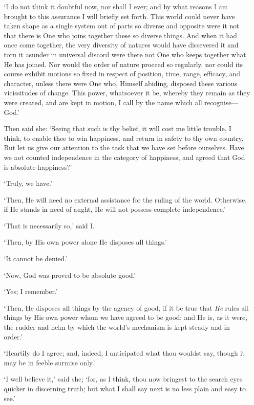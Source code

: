 \documentclass[11pt]{book}
\begin{document}
`I do not think it doubtful now, nor shall I ever; and by what reasons
I am brought to this assurance I will briefly set forth. This world
could never have taken shape as a single system out of parts so diverse
and opposite were it not that there is One who joins together these so
diverse things. And when it had once come together, the very diversity
of natures would have dissevered it and torn it asunder in universal
discord were there not One who keeps together what He has joined. Nor
would the order of nature proceed so regularly, nor could its course
exhibit motions so fixed in respect of position, time, range, efficacy,
and character, unless there were One who, Himself abiding, disposed
these various vicissitudes of change. This power, whatsoever it be,
whereby they remain as they were created, and are kept in motion, I call
by the name which all recognise---God.'

Then said she: `Seeing that such is thy belief, it will cost me little
trouble, I think, to enable thee to win happiness, and return in safety
to thy own country. But let us give our attention to the task that we
have set before ourselves. Have we not counted independence in the
category of happiness, and agreed that God is absolute happiness?'

`Truly, we have.'

`Then, He will need no external assistance for the ruling of the world.
Otherwise, if He stands in need of aught, He will not possess complete
independence.'

`That is necessarily so,' said I.

`Then, by His own power alone He disposes all things.'

`It cannot be denied.'

`Now, God was proved to be absolute good.'

`Yes; I remember.'

`Then, He disposes all things by the agency of good, if it be true that
\emph{He} rules all things by His own power whom we have agreed to be good;
and He is, as it were, the rudder and helm by which the world's
mechanism is kept steady and in order.'

`Heartily do I agree; and, indeed, I anticipated what thou wouldst say,
though it may be in feeble surmise only.'

`I well believe it,' said she; `for, as I think, thou now bringest to
the search eyes quicker in discerning truth; but what I shall say next
is no less plain and easy to see.'
\end{document}
